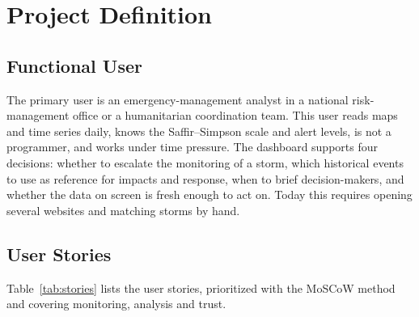 \documentclass[10pt,twocolumn,letterpaper]{article}
\begin{document}
\section{Project Definition}\label{sec:project}

\subsection{Functional User}
The primary user is an emergency-management analyst in a national risk-management office or a humanitarian coordination team. This user reads maps and time series daily, knows the Saffir--Simpson scale and alert levels, is not a programmer, and works under time pressure. The dashboard supports four decisions: whether to escalate the monitoring of a storm, which historical events to use as reference for impacts and response, when to brief decision-makers, and whether the data on screen is fresh enough to act on. Today this requires opening several websites and matching storms by hand.

\subsection{User Stories}
Table~\ref{tab:stories} lists the user stories, prioritized with the MoSCoW method and covering monitoring, analysis and trust.
\end{document}
